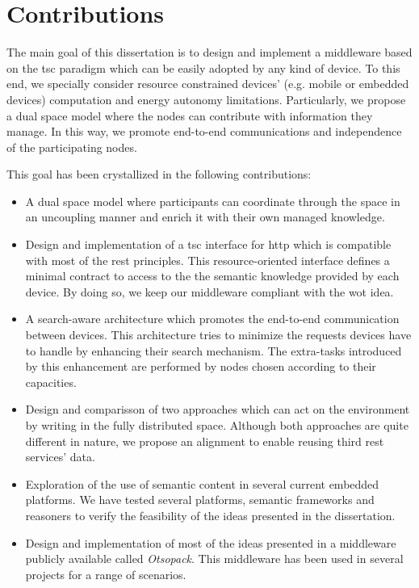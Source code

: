 \section{Contributions}
\label{sec:Contributions}

The main goal of this dissertation is to design and implement a middleware based on the \ac{tsc} paradigm which can be easily adopted by any kind of device.
To this end, we specially consider resource constrained devices' (e.g. mobile or embedded devices) computation and energy autonomy limitations.
Particularly, we propose a dual space model where the nodes can contribute with information they manage. %
In this way, we promote end-to-end communications and independence of the participating nodes.


This goal has been crystallized in the following contributions:

\begin{itemize} %
  \item A dual space model where participants can coordinate through the space in an uncoupling manner and enrich it with their own managed knowledge.
  \item Design and implementation of a \ac{tsc} interface for \ac{http} which is compatible with most of the \ac{rest} principles.
	This resource-oriented interface defines a minimal contract to access to the the semantic knowledge provided by each device.
	By doing so, we keep our middleware compliant with the \ac{wot} idea. %
  \item A search-aware architecture which promotes the end-to-end communication between devices. %
	This architecture tries to minimize the requests devices have to handle by enhancing their search mechanism.
	The extra-tasks introduced by this enhancement are performed by nodes chosen according to their capacities.
  \item Design and comparisson of two approaches which can act on the environment by writing in the fully distributed space.
	Although both approaches are quite different in nature, we propose an alignment to enable reusing third \ac{rest} services' data.
  \item Exploration of the use of semantic content in several current embedded platforms.
	We have tested several platforms, semantic frameworks and reasoners to verify the feasibility of the ideas presented in the dissertation.
  \item Design and implementation of most of the ideas presented in a middleware publicly available called \emph{Otsopack}. %
	This middleware has been used in several projects for a range of scenarios.
\end{itemize}